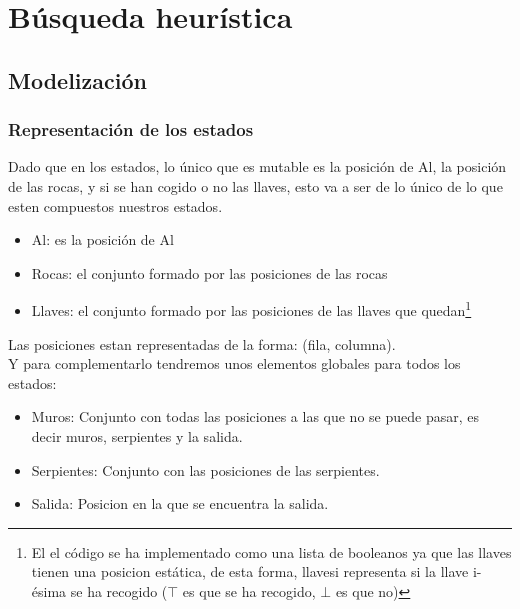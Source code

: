 \documentclass[11pt,spanish]{article}
\begin{document}
	\section{Búsqueda heurística}
		\subsection{Modelización}
			\subsubsection{Representación de los estados}
				Dado que en los estados, lo único que es mutable es la posición de Al, la posición de las rocas, y si se han cogido o no las llaves, esto va a ser de lo único de lo que esten compuestos nuestros estados.
				\begin{itemize}
					\item Al: es la posición de Al
					\item Rocas: el conjunto formado por las posiciones de las rocas
					\item Llaves: el conjunto formado por las posiciones de las llaves que quedan\footnote{El el código se ha implementado como una lista de booleanos ya que las llaves tienen una posicion estática, de esta forma, llavesi representa si la llave i-ésima se ha recogido ($\top$ es que se ha recogido, $\bot$ es que no)}
				\end{itemize}
				Las posiciones estan representadas de la forma: (fila, columna).\\
				Y para complementarlo tendremos unos elementos globales para todos los estados:
				\begin{itemize}
					\item Muros: Conjunto con todas las posiciones a las que no se puede pasar, es decir muros, serpientes y la salida.
					\item Serpientes: Conjunto con las posiciones de las serpientes.
					\item Salida: Posicion en la que se encuentra la salida.
				\end{itemize}
\end{document}
